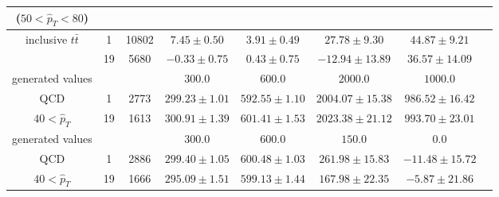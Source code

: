 \documentclass{cmspaper}
\begin{document}
\begin{table} [th]
\begin{center}
\begin{tabular}{|c|c|c|c|c|c|c|c|}
($50<\hat{p}_T<80$)               &     &       &                   &                   &                     &                \\ \hline
inclusive $t\bar{t}$              &   1 & 10802 & $7.45   \pm 0.50$ & $3.91  \pm 0.49$  & $27.78   \pm 9.30$  & $44.87  \pm 9.21$   \\
                                  & 19  & 5680  & $-0.33  \pm 0.75$ & $0.43  \pm 0.75$  & $-12.94  \pm 13.89$ & $36.57  \pm 14.09$  \\ \hline\hline
generated values                  &     &       & $300.0$           & $600.0$           & $2000.0$            & $1000.0$            \\ \hline
QCD                               &  1  & 2773  & $299.23 \pm 1.01$ & $592.55 \pm 1.10$ & $2004.07 \pm 15.38$ & $986.52 \pm 16.42$  \\
$40<\hat{p}_T$                    & 19  & 1613  & $300.91 \pm 1.39$ & $601.41 \pm 1.53$ & $2023.38 \pm 21.12$ & $993.70 \pm 23.01$  \\ \hline\hline
generated values                  &     &       & $300.0$           &$600.0$            & $150.0$             & $0.0$               \\ \hline
QCD                               &  1  & 2886  & $299.40 \pm 1.05$ & $600.48 \pm 1.03$ & $261.98  \pm 15.83$ & $-11.48 \pm 15.72$  \\
$40<\hat{p}_T$                    & 19  & 1666  & $295.09 \pm 1.51$ & $599.13 \pm 1.44$ & $167.98  \pm 22.35$ & $-5.87  \pm 21.86$  \\ \hline
\end{tabular}
\end{center}

\end{table} 
\end{document}
